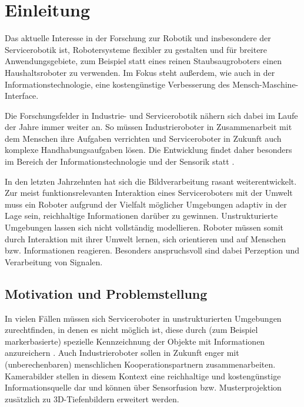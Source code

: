 \chapter{Einleitung}
\label{einleitung_cha}
Das aktuelle Interesse in der Forschung zur Robotik und insbesondere der Servicerobotik ist, Robotersysteme flexibler zu gestalten und für breitere Anwendungsgebiete, zum Beispiel statt eines reinen Staubsaugroboters einen Haushaltsroboter zu verwenden.
Im Fokus steht außerdem, wie auch in der Informationstechnologie, eine kostengünstige Verbesserung des Mensch-Maschine-Interface.
 \citep{IP08}

Die Forschungsfelder in Industrie- und Servicerobotik nähern sich dabei im Laufe der Jahre immer weiter an.
 So müssen Industrieroboter in Zusammenarbeit mit dem Menschen ihre Aufgaben verrichten und Serviceroboter
 in Zukunft auch komplexe Handhabungsaufgaben lösen. Die Entwicklung findet daher besonders im Bereich der
 Informationstechnologie und der Sensorik statt \citep{Michael2010}.
 
In den letzten Jahrzehnten hat sich die Bildverarbeitung rasant weiterentwickelt.
 Zur meist funktionsrelevanten Interaktion eines Serviceroboters mit der Umwelt muss
 ein Roboter aufgrund der Vielfalt möglicher Umgebungen adaptiv in der Lage sein, reichhaltige
 Informationen darüber zu gewinnen. Unstrukturierte Umgebungen lassen sich nicht vollständig modellieren.
 Roboter müssen somit durch Interaktion mit ihrer Umwelt lernen, sich orientieren und auf Menschen bzw. Informationen reagieren.
 Besonders anspruchsvoll sind dabei Perzeption und Verarbeitung von Signalen.

\section{Motivation und Problemstellung}
\label{motivation_sec}

In vielen Fällen müssen sich Serviceroboter in unstrukturierten Umgebungen zurechtfinden, in denen es nicht möglich ist, diese durch
 (zum Beispiel markerbasierte) spezielle Kennzeichnung der Objekte mit Informationen anzureichern \citep{sturm10rss-workshop}.
 Auch Industrieroboter sollen in Zukunft enger mit (unberechenbaren) menschlichen Kooperationspartnern zusammenarbeiten.
 Kamerabilder stellen in diesem Kontext eine reichhaltige und kostengünstige Informationsquelle dar und können über Sensorfusion bzw. Musterprojektion zusätzlich
 zu 3D-Tiefenbildern erweitert werden. 

